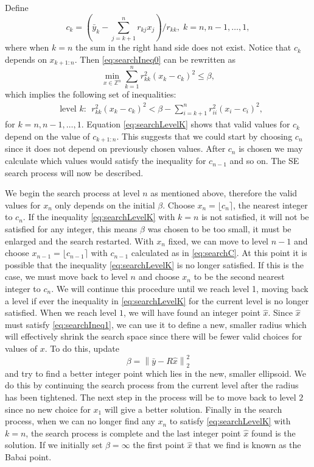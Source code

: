 \documentclass[12pt,Bold,letterpaper]{mcgilletdclass}
\begin{document}
Define
\begin{equation}
 c_k = (\bar{y}_k - \sum_{j=k+1}^nr_{kj}x_j)/r_{kk}, \; k=n, n-1,\ldots, 1,
\label{eq:searchC}
\end{equation}
where when $k=n$ the sum in the right hand side does not exist. Notice that $c_k$ depends on $x_{k+1:n}$.
Then \eqref{eq:searchIneq0} can be rewritten as
\begin{equation}\label{eq:searchIneq1}
\min_{x \in  {\mathbb{Z}^n}} \sum_{k=1}^n r_{kk}^2(x_k-c_k)^2 \le \beta,
\end{equation}
which implies the following
set of inequalities:
\begin{align}
&\text{level } k: \ \ r_{kk}^2(x_k-c_k)^2 < \beta -\sum_{i=k+1}^nr_{ii}^2(x_i-c_i)^2, \label{eq:searchLevelK}
\end{align}
for $k=n,n-1,\ldots, 1$. Equation \eqref{eq:searchLevelK} shows that valid values for $c_k$ depend on the value of $c_{k+1:n}$. This suggests that we could start by choosing $c_n$ since it does not depend on previously chosen values. After $c_n$ is chosen we may calculate which values would satisfy the inequality for $c_{n-1}$ and so on. The SE search process will now be described.

We begin the search process
at level $n$ as mentioned above, therefore the valid values for $x_n$ only depends on the initial $\beta$. Choose $x_n = \lfloor c_n \rceil$, the nearest integer to $c_n$. If the inequality \eqref{eq:searchLevelK} with $k=n$
is not satisfied, it will not be satisfied for any integer, this means $\beta$
was chosen to be too small, it must be enlarged and the search restarted. With $x_n$ fixed, we can move
to level $n-1$ and choose $x_{n-1} = \lfloor c_{n-1} \rceil$ with $c_{n-1}$ calculated as in \eqref{eq:searchC}. At this point it is possible that the inequality \eqref{eq:searchLevelK} is no longer satisfied. If this is the case, we must move back to level $n$ and choose $x_n$ to be the second nearest integer to $c_n$.  We will continue this procedure until we reach
level 1, moving back a level if ever the inequality in \eqref{eq:searchLevelK} for the current level is no longer satisfied. When we reach level $1$, we will have found an integer point $\hat{x}$. Since $\hat{x}$ must satisfy \ref{eq:searchIneq1}, we can use it to define a new, smaller radius which will effectively shrink the search space since there will be fewer valid choices for values of $x$.  To do this, update $$\beta = \left \| \bar{y} - R\hat{x} \right \|_2^2$$ and try to find a better integer point which lies in the new, smaller ellipsoid. We do this by continuing the search process from the current level after the radius has been tightened. The next step in the process will be to move back to level $2$ since no new choice for $x_1$ will give a better solution. Finally in the search process, when we can no longer find any $x_n$ to satisfy \eqref{eq:searchLevelK} with $k=n$, the search process is complete and the last integer point $\hat{x}$ found is the solution. If we initially set $\beta = \infty$ the first point $\hat{x}$ that we find is known as the Babai point.
\end{document}
